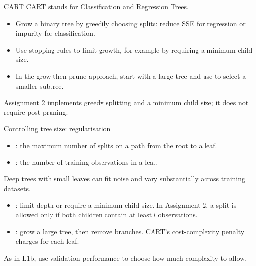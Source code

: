 \documentclass[10pt]{beamer}
\begin{document}

\begin{frame}{CART}
CART stands for Classification and Regression Trees.
\begin{itemize}
\item Grow a binary tree by greedily choosing splits: reduce SSE for regression or impurity for classification.
\pause
\item Use stopping rules to limit growth, for example by requiring a minimum child size.
\pause
\item In the grow-then-prune approach, start with a large tree and use  to select a smaller subtree.
\end{itemize}
Assignment 2 implements greedy splitting and a minimum child size; it does not require post-pruning.
\end{frame}

\begin{frame}{Controlling tree size: regularisation}
\begin{itemize}
\item {}: the maximum number of splits on a path from the root to a leaf.
\item {}: the number of training observations in a leaf.
\end{itemize}
Deep trees with small leaves can fit noise and vary substantially across training datasets.
\pause
\begin{itemize}
\item {}: limit depth or require a minimum child size. In Assignment 2, a split is allowed only if both children contain at least $l$ observations.
\item {}: grow a large tree, then remove branches. CART's cost-complexity penalty charges for each leaf.
\end{itemize}
\pause
As in L1b, use validation performance to choose how much complexity to allow.
\end{frame}
\end{document}
